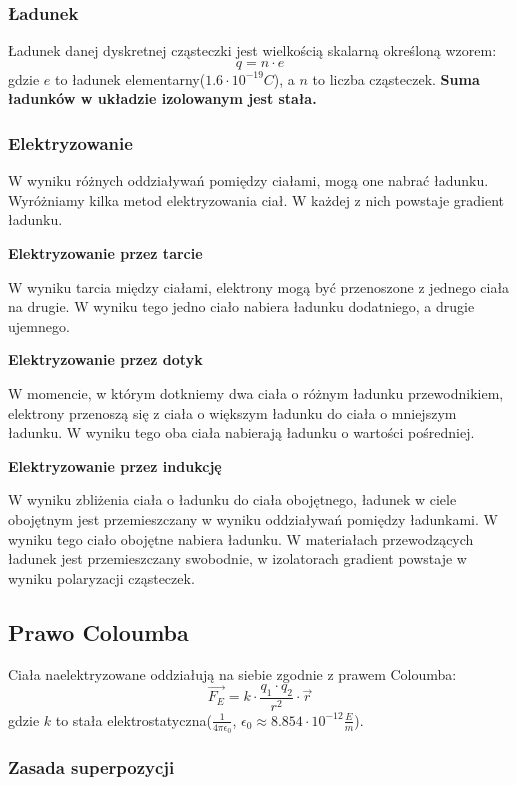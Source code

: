 \documentclass{../notatki}
\begin{document}
\subsubsection{Ładunek}

Ładunek danej dyskretnej cząsteczki jest wielkością skalarną określoną wzorem:
$$
q = n \cdot e
$$
gdzie $e$ to ładunek elementarny($1.6 \cdot 10^{-19} C$), a $n$ to liczba
cząsteczek.
\textbf{Suma ładunków w układzie izolowanym jest stała.}

\subsubsection{Elektryzowanie}

W wyniku różnych oddziaływań pomiędzy ciałami, mogą one nabrać
ładunku. Wyróżniamy
kilka metod elektryzowania ciał. W każdej z nich powstaje gradient ładunku.

\textbf{Elektryzowanie przez tarcie}

W wyniku tarcia między ciałami, elektrony mogą być przenoszone z
jednego ciała na
drugie. W wyniku tego jedno ciało nabiera ładunku dodatniego, a drugie ujemnego.

\textbf{Elektryzowanie przez dotyk}

W momencie, w którym dotkniemy dwa ciała o różnym ładunku
przewodnikiem, elektrony
przenoszą się z ciała o większym ładunku do ciała o mniejszym
ładunku. W wyniku tego
oba ciała nabierają ładunku o wartości pośredniej.

\textbf{Elektryzowanie przez indukcję}

W wyniku zbliżenia ciała o ładunku do ciała obojętnego, ładunek
w ciele obojętnym jest przemieszczany w wyniku oddziaływań pomiędzy
ładunkami. W wyniku tego ciało obojętne nabiera ładunku. W materiałach
przewodzących ładunek jest przemieszczany swobodnie, w izolatorach gradient
powstaje w wyniku polaryzacji cząsteczek.

\subsection{Prawo Coloumba}

Ciała naelektryzowane oddziałują na siebie zgodnie z prawem Coloumba:
$$
\vec{F_E} = k \cdot \frac{q_1 \cdot q_2}{r^2} \cdot \vec{r}
$$
gdzie $k$ to stała elektrostatyczna($\frac{1}{4\pi\epsilon_0}$,
$\epsilon_0\approx8.854\cdot10^{-12}\frac{E}{m}$).

\subsubsection{Zasada superpozycji}
\end{document}
